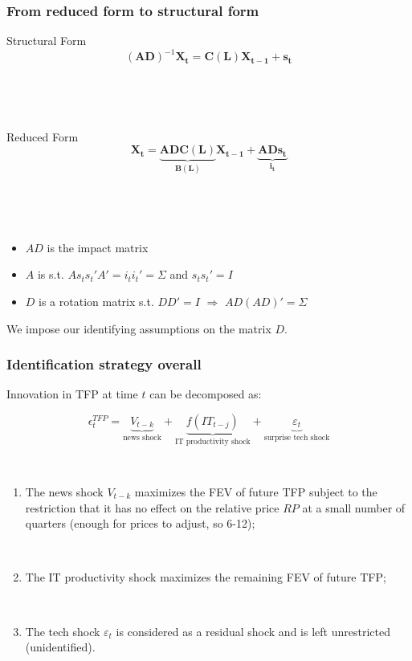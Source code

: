 \documentclass{beamer}
\begin{document}
\begin{frame}
	\frametitle{From reduced form to structural form}
	\label{identification}
	
Structural Form	
\begin{equation}
(\mathbf{AD})^{-1}
    \mathbf{X_{t}}
= \mathbf{C(L)} 
\mathbf{X_{t-1}}
+ \mathbf{s_t}
\end{equation}

\

\

Reduced Form
\begin{equation}
\mathbf{X_{t}}
= \underbrace{\mathbf{AD} \mathbf{C(L)}}_\text{$\mathbf{B(L)}$} 
\mathbf{X_{t-1}}
+ \underbrace{\mathbf{AD} \mathbf{s_t}}_\text{$\mathbf{i_t}$}
\end{equation}

\

\

\begin{itemize}
	\item $AD$ is the impact matrix
	\item $A$ is s.t. $As_t s_t' A' = i_t i_t' = \Sigma$ and $s_t s_t' = I$
	\item $D$ is a rotation matrix s.t. $DD' = I$ $\Rightarrow$ $AD(AD)' = \Sigma$
\end{itemize}

We impose our identifying assumptions on the matrix $D$. \hyperlink{Technicalities}{}

\end{frame}


\begin{frame}
	\frametitle{Identification strategy overall}

Innovation in TFP at time $t$ can be decomposed as:

\begin{equation}
\epsilon^{TFP}_t =   \underbrace{V_{t-k}}_\text{news shock} + \underbrace{f(IT_{t-j})}_\text{IT productivity shock}  + \underbrace{\varepsilon_t}_\text{surprise tech shock} 
\end{equation}

\

    \begin{enumerate}
    	\item The news shock $V_{t-k}$ maximizes the FEV of future TFP subject to the restriction that it has no effect on the relative price $RP$ at a small number of quarters (enough for prices to adjust, so 6-12);
	
	\
	
    \item The IT productivity shock maximizes the remaining FEV of future TFP;
    
    \
    
    \item The tech shock $\varepsilon_t$ is considered as a residual shock and is left unrestricted (unidentified).
   \end{enumerate}
	
	
\end{frame}
\end{document}
